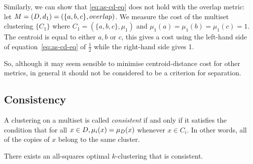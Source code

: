 Similarly, we can show that \eqref{eq:as-cd-eq} does not hold with the overlap
metric: let $M = (D,d_1) = (\{a,b,c\},overlap)$.  We measure the cost of
the multiset clustering $\{C_1\}$ where $C_1 = (\{a,b,c\},\mu_1)$ and
$\mu_1(a)=\mu_1(b)=\mu_1(c)=1$.  The centroid is equal to either $a,b$ or $c$,
this gives a cost using the left-hand side of equation~\eqref{eq:as-cd-eq} of
$\frac{1}{2}$ while the right-hand side gives 1.

So, although it may seem sensible to minimise centroid-distance cost for other
metrics, in general it should not be considered to be a criterion for
separation.

\subsection{Consistency}
\label{sec:consistency}

\begin{dfn}
  \label{dfn:consistency}
  A clustering on a multiset is called \textit{consistent} if and only if it
  satisfies the condition that for all $x \in D, \mu_i(x) =
  \mu_{D}(x)$ whenever $x \in C_i$.  In other words, all of the copies of
  $x$ belong to the same cluster.
\end{dfn}

\begin{thm}
  There exists an all-squares optimal $k$-clustering that is consistent.
\end{thm}

